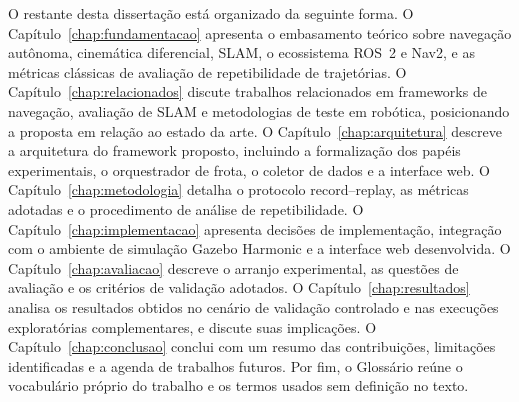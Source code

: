 O restante desta dissertação está organizado da seguinte forma. O
Capítulo~\ref{chap:fundamentacao} apresenta o embasamento teórico sobre
navegação autônoma, cinemática diferencial, SLAM, o ecossistema ROS~2 e Nav2,
e as métricas clássicas de avaliação de repetibilidade de trajetórias. O
Capítulo~\ref{chap:relacionados} discute trabalhos relacionados em frameworks
de navegação, avaliação de SLAM e metodologias de teste em robótica,
posicionando a proposta em relação ao estado da arte. O
Capítulo~\ref{chap:arquitetura} descreve a arquitetura do framework proposto,
incluindo a formalização dos papéis experimentais, o orquestrador de frota, o
coletor de dados e a interface web. O Capítulo~\ref{chap:metodologia} detalha
o protocolo record--replay, as métricas adotadas e o procedimento de análise
de repetibilidade. O Capítulo~\ref{chap:implementacao} apresenta decisões de
implementação, integração com o ambiente de simulação Gazebo Harmonic e a
interface web desenvolvida. O Capítulo~\ref{chap:avaliacao} descreve o arranjo
experimental, as questões de avaliação e os critérios de validação adotados. O
Capítulo~\ref{chap:resultados} analisa os resultados obtidos no cenário de
validação controlado e nas execuções exploratórias complementares, e discute
suas implicações. O Capítulo~\ref{chap:conclusao} conclui com um resumo das
contribuições, limitações identificadas e a agenda de trabalhos futuros. Por
fim, o Glossário reúne o vocabulário próprio do trabalho e os termos usados sem
definição no texto.
